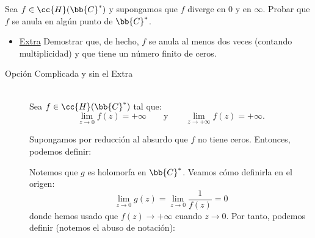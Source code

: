 \documentclass[12pt]{article}
\begin{document}
    \begin{ejercicio}[2.5 + 1.5 puntos]
        Sea $f \in \cc{H}(\bb{C}^*)$ y supongamos que $f$ diverge en $0$ y en $\infty$.
        Probar que $f$ se anula en algún punto de $\bb{C}^*$.
        \begin{itemize}
            \item \ul{Extra} Demostrar que, de hecho, $f$ se anula al menos dos veces (contando multiplicidad) y que tiene un número finito de ceros. 
        \end{itemize}


        \begin{description}
            \item[Opción Complicada y sin el Extra]~\\
            

                Sea $f \in \cc{H}(\bb{C}^*)$ tal que:
                \begin{equation*}
                    \lim_{z\to 0} f(z) = +\infty \qquad \text{y} \qquad \lim_{z\to +\infty} f(z) = +\infty.
                \end{equation*}
        
                Supongamos por reducción al absurdo que $f$ no tiene ceros. Entonces, podemos definir:
        
                Notemos que $g$ es holomorfa en $\bb{C}^*$. Veamos cómo definirla en el origen:
                \begin{equation*}
                    \lim_{z\to 0} g(z) = \lim_{z\to 0} \frac{1}{f(z)} = 0
                \end{equation*}
                donde hemos usado que $f(z) \to +\infty$ cuando $z\to 0$. Por tanto, podemos definir (notemos el abuso de notación):
        

\end{description}
\end{ejercicio}
\end{document}
